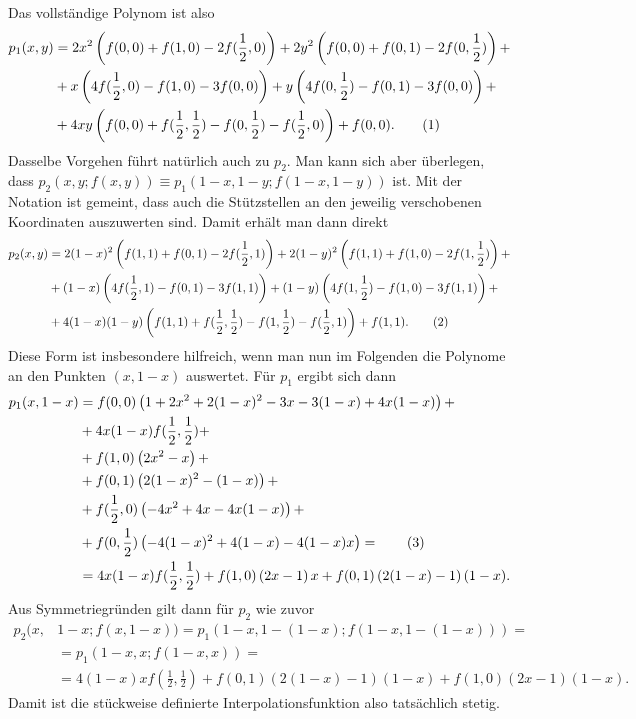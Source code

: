\documentclass[english, parskip=full]{scrartcl}
\newcommand\numberthis{\addtocounter{equation}{1}\tag{\theequation}}
\newcommand{\kla}{}
\begin{document}
Das vollständige Polynom ist also
\begin{align*}
p_1(x,y)&=2x^2\kla\left( f(0,0)+f(1,0)-2f(\frac{1}{2},0) \right)+2y^2\kla\left( f(0,0)+f(0,1)-2f(0,\frac{1}{2}) \right)+\\
&+x\kla\left( 4f(\frac{1}{2},0)-f(1,0)-3f(0,0) \right)+y\kla\left( 4f(0,\frac{1}{2})-f(0,1)-3f(0,0) \right)+\\
&+4xy\kla\left( f(0,0)+f(\frac{1}{2},\frac{1}{2})-f(0,\frac{1}{2})-f(\frac{1}{2},0) \right)+f(0,0). \numberthis\label{eqn:p1xy}
\end{align*}
Dasselbe Vorgehen führt natürlich auch zu $p_2$. 
Man kann sich aber überlegen, dass $p_2(x,y;f(x,y))\equiv p_1(1-x,1-y;f(1-x,1-y))$ ist.
Mit der Notation ist gemeint, dass auch die Stützstellen an den jeweilig verschobenen Koordinaten auszuwerten sind.
Damit erhält man dann direkt
\begin{align*}
p_2(x,y)&=2(1-x)^2\kla\left( f(1,1)+f(0,1)-2f(\frac{1}{2},1) \right)+2(1-y)^2\kla\left( f(1,1)+f(1,0)-2f(1,\frac{1}{2}) \right)+\\
&+(1-x)\kla\left( 4f(\frac{1}{2},1)-f(0,1)-3f(1,1) \right)+(1-y)\kla\left( 4f(1,\frac{1}{2})-f(1,0)-3f(1,1) \right)+\\
&+4(1-x)(1-y)\kla\left( f(1,1)+f(\frac{1}{2},\frac{1}{2})-f(1,\frac{1}{2})-f(\frac{1}{2},1) \right)+f(1,1). \numberthis\label{eqn:p2xy}
\end{align*}
Diese Form ist insbesondere hilfreich, wenn man nun im Folgenden die Polynome an den Punkten $(x,1-x)$ auswertet.
Für $p_1$ ergibt sich dann
\begin{align*}
p_1(x,1-x)&=f(0,0)\kla\left( 1+2x^2+2(1-x)^2-3x-3(1-x)+4x(1-x) \right) + \\
&+4x(1-x)f(\frac{1}{2},\frac{1}{2})+\\
&+f(1,0)\kla\left( 2x^2-x \right)+ \\
&+f(0,1)\kla\left( 2(1-x)^2-(1-x) \right)+\\
&+f(\frac{1}{2},0)\kla\left( -4x^2+4x-4x(1-x) \right)+\\
&+f(0,\frac{1}{2})\kla\left( -4(1-x)^2+4(1-x)-4(1-x)x \right)= \numberthis\\
&=4x(1-x)f(\frac{1}{2},\frac{1}{2})+f(1,0)\kla\left( 2x-1 \right)x+f(0,1)\kla\left( 2(1-x)-1 \right)(1-x).
\end{align*}
Aus Symmetriegründen gilt dann für $p_2$ wie zuvor
\begin{align}
p_2( x,&1-x;f(x,1-x) )=p_1\kla\left( 1-x, 1-(1-x); f(1-x, 1-(1-x)) \right)=\\
&=p_1(1-x,x;f(1-x,x))=\\
&=4(1-x)xf(\frac{1}{2},\frac{1}{2})+f(0,1)(2(1-x)-1)(1-x)+f(1,0)(2x-1)(1-x).
\end{align}
Damit ist die stückweise definierte Interpolationsfunktion also tatsächlich stetig.
\end{document}
